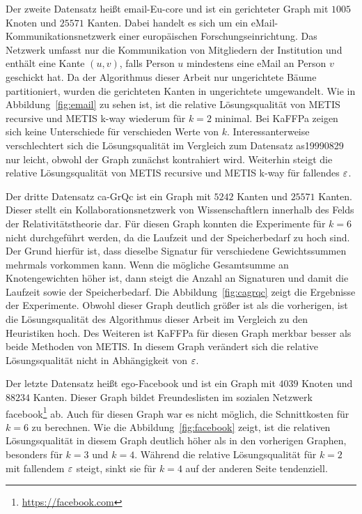 Der zweite Datensatz heißt email-Eu-core und ist ein gerichteter Graph mit $1005$ Knoten und $25571$ Kanten.
Dabei handelt es sich um ein eMail\hyp Kommunikationsnetzwerk einer europäischen Forschungseinrichtung.
Das Netzwerk umfasst nur die Kommunikation von Mitgliedern der Institution und enthält eine Kante $(u, v)$, falls Person $u$ mindestens eine eMail an Person $v$ geschickt hat.
Da der Algorithmus dieser Arbeit nur ungerichtete Bäume partitioniert, wurden die gerichteten Kanten in ungerichtete umgewandelt.
Wie in Abbildung~\ref{fig:email} zu sehen ist, ist die relative Lösungsqualität von METIS recursive und METIS k-way wiederum für $k=2$ minimal.
Bei KaFFPa zeigen sich keine Unterschiede für verschieden Werte von $k$.
Interessanterweise verschlechtert sich die Lösungsqualität im Vergleich zum Datensatz as19990829 nur leicht, obwohl der Graph zunächst kontrahiert wird.
Weiterhin steigt die relative Lösungsqualität von METIS recursive und METIS k-way für fallendes $\varepsilon$.

Der dritte Datensatz ca-GrQc ist ein Graph mit $5242$ Kanten und $25571$ Kanten.
Dieser stellt ein Kollaborationsnetzwerk von Wissenschaftlern innerhalb des Felds der Relativitätstheorie dar.
Für diesen Graph konnten die Experimente für $k=6$ nicht durchgeführt werden, da die Laufzeit und der Speicherbedarf zu hoch sind. 
Der Grund hierfür ist, dass dieselbe Signatur für verschiedene Gewichtssummen mehrmals vorkommen kann. 
Wenn die mögliche Gesamtsumme an Knotengewichten höher ist, dann steigt die Anzahl an Signaturen und damit die Laufzeit sowie der Speicherbedarf.
Die Abbildung~\ref{fig:cagrqc} zeigt die Ergebnisse der Experimente.
Obwohl dieser Graph deutlich größer ist als die vorherigen, ist die Lösungsqualität des Algorithmus dieser Arbeit im Vergleich zu den Heuristiken hoch.
Des Weiteren ist KaFFPa für diesen Graph merkbar besser als beide Methoden von METIS.
In diesem Graph verändert sich die relative Lösungsqualität nicht in Abhängigkeit von $\varepsilon$.

Der letzte Datensatz heißt ego-Facebook und ist ein Graph mit $4039$ Knoten und $88234$ Kanten.
Dieser Graph bildet Freundeslisten im sozialen Netzwerk facebook\footnote{\url{https://facebook.com}} ab.
Auch für diesen Graph war es nicht möglich, die Schnittkosten für $k=6$ zu berechnen.
Wie die Abbildung~\ref{fig:facebook} zeigt, ist die relativen Lösungsqualität in diesem Graph deutlich höher als in den vorherigen Graphen, besonders für $k=3$ und $k=4$.
Während die relative Lösungsqualität für $k=2$ mit fallendem $\varepsilon$ steigt, sinkt sie für $k=4$ auf der anderen Seite tendenziell.

